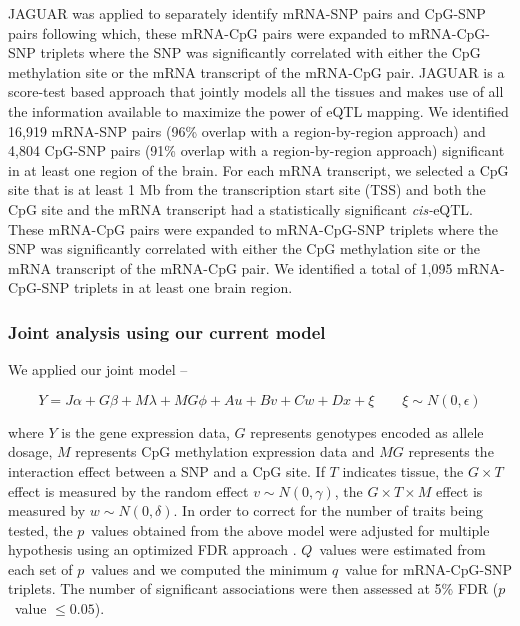 \documentclass[hidelinks]{article}
\begin{document}
JAGUAR was applied to separately identify mRNA-SNP pairs and CpG-SNP pairs following which, these mRNA-CpG pairs were expanded to mRNA-CpG-SNP triplets where the SNP was significantly correlated with either the CpG methylation site or the mRNA transcript of the mRNA-CpG pair. JAGUAR is a score-test based approach that jointly models all the tissues and makes use of all the information available to maximize the power of eQTL mapping. We identified 16,919 mRNA-SNP pairs (96\% overlap with a region-by-region approach) and 4,804 CpG-SNP pairs (91\% overlap with a region-by-region approach) significant in at least one region of the brain. For each mRNA transcript, we selected a CpG site that is at least 1 Mb from the transcription start site (TSS) and both the CpG site and the mRNA transcript had a statistically significant \emph{cis-}eQTL. These mRNA-CpG pairs were expanded to mRNA-CpG-SNP triplets where the SNP was significantly correlated with either the CpG methylation site or the mRNA transcript of the mRNA-CpG pair. We identified a total of 1,095 mRNA-CpG-SNP triplets in at least one brain region. 

\subsubsection{Joint analysis using our current model}

We applied our joint model --

\begin{equation*}
Y = J\alpha + G\beta + M\lambda + MG\phi + Au + Bv + Cw + Dx + \xi	\qquad \xi \sim N\left(0, \epsilon \right)
\end{equation*}

where $Y$ is the gene expression data, $G$ represents genotypes encoded as allele dosage, $M$ represents CpG methylation expression data and $MG$ represents the interaction effect between a SNP and a CpG site. If $T$ indicates tissue, the $G \times T$ effect is measured by the random effect $v \sim N\left(0,\gamma \right)$, the $G \times T \times M$ effect is measured by $w \sim N\left(0,\delta\right)$. In order to correct for the number of traits being tested, the $p$~values obtained from the above model were adjusted for multiple hypothesis using an optimized FDR approach \cite{qvalue}.  $Q$~values were estimated from each set of $p$~values and we computed the minimum $q$~value for mRNA-CpG-SNP triplets. The number of significant associations were then assessed at 5\% FDR ($p$~value $\leq 0.05$). 
\end{document}
